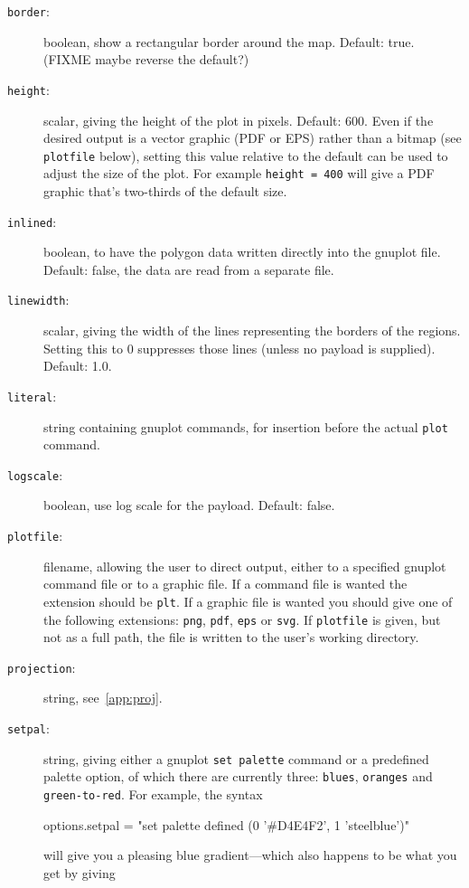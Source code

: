 \documentclass{article}
\begin{document}
\begin{description}
\item[\texttt{border}:] boolean, show a rectangular border around the
  map. Default: true. (FIXME maybe reverse the default?)
\item[\texttt{height}:] scalar, giving the height of the plot in
  pixels. Default: 600. Even if the desired output is a vector graphic
  (PDF or EPS) rather than a bitmap (see \texttt{plotfile} below),
  setting this value relative to the default can be used to adjust the
  size of the plot. For example \texttt{height = 400} will give a PDF
  graphic that's two-thirds of the default size.
\item[\texttt{inlined}:] boolean, to have the polygon data written
  directly into the \textsf{gnuplot} file. Default: false, the data
  are read from a separate file.
\item[\texttt{linewidth}:] scalar, giving the width of the lines
  representing the borders of the regions. Setting this to 0
  suppresses those lines (unless no payload is supplied). Default:
  1.0.
\item[\texttt{literal}:] string containing \textsf{gnuplot} commands,
  for insertion before the actual \texttt{plot} command.
\item[\texttt{logscale}:] boolean, use log scale for the
  payload. Default: false.
\item[\texttt{plotfile}:] filename, allowing the user to direct
  output, either to a specified \textsf{gnuplot} command file or to a
  graphic file. If a command file is wanted the extension should be
  \texttt{plt}. If a graphic file is wanted you should give one of the
  following extensions: \texttt{png}, \texttt{pdf}, \texttt{eps} or
  \texttt{svg}.  If \texttt{plotfile} is given, but not as a full
  path, the file is written to the user's working directory.
\item[\texttt{projection}:] string, see~\ref{app:proj}.
\item[\texttt{setpal}:] string, giving either a \textsf{gnuplot}
  \texttt{set palette} command or a predefined palette option, of
  which there are currently three: \texttt{blues}, \texttt{oranges}
  and \texttt{green-to-red}. For example, the syntax
  \begin{code}
    options.setpal = "set palette defined (0 '#D4E4F2', 1 'steelblue')"
  \end{code}
  will give you a pleasing blue gradient---which also happens to be
  what you get by giving
  \begin{code}

\end{code}
\end{description}
\end{document}
